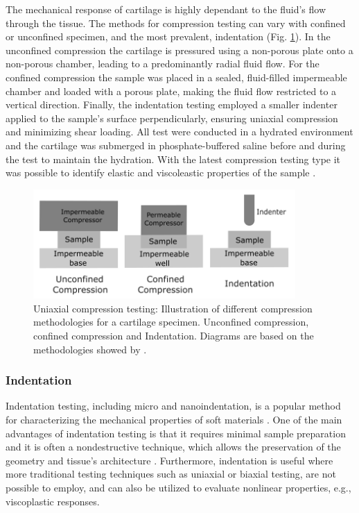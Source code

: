 The mechanical response of cartilage is highly dependant to the fluid's flow through the tissue. The methods for compression 
testing can vary with confined or unconfined specimen, and the most prevalent, indentation (Fig. \ref{fig:compressiontypes}).
In the unconfined compression the cartilage is pressured using a non-porous plate onto a non-porous chamber, 
leading to a predominantly radial fluid flow. For the confined compression the sample was placed in a sealed, 
fluid-filled impermeable chamber and loaded with a porous plate, making the fluid flow restricted to a vertical direction.
Finally, the indentation testing employed a smaller indenter applied to the sample's surface perpendicularly, ensuring 
uniaxial compression and minimizing shear loading. All test were conducted in a 
hydrated environment and the cartilage was submerged in phosphate-buffered saline before and during the test to maintain 
the hydration. With the latest compression testing type it was possible to identify elastic and viscoleastic properties 
of the sample \cite{Griffin2016}.

\begin{figure}%
        \centering
       \quad
       \includegraphics[width=10cm]{Images/chapter1/compressiontypes.png}%
       \caption[Uniaxial compression testing methodologies]{Uniaxial compression testing: Illustration of different compression methodologies for a cartilage specimen. Unconfined compression, confined compression and Indentation. Diagrams are based on the methodologies showed by \citet{Griffin2016}.}%
       \label{fig:compressiontypes}%
\end{figure}

\subsubsection*{Indentation}
Indentation testing, including micro and nanoindentation, is a popular method for characterizing 
the mechanical properties of soft materials \cite{Wu2016}. One of the main advantages of 
indentation testing is that it requires minimal sample preparation and it is often a 
nondestructive technique, which allows the preservation of the geometry and tissue's architecture \cite{Shi2019}.
Furthermore, indentation is useful where more traditional testing techniques such as 
uniaxial or biaxial testing, are not possible to employ, 
and can also be utilized to evaluate nonlinear properties, e.g., viscoplastic responses\cite{Bergström2015}.\\


